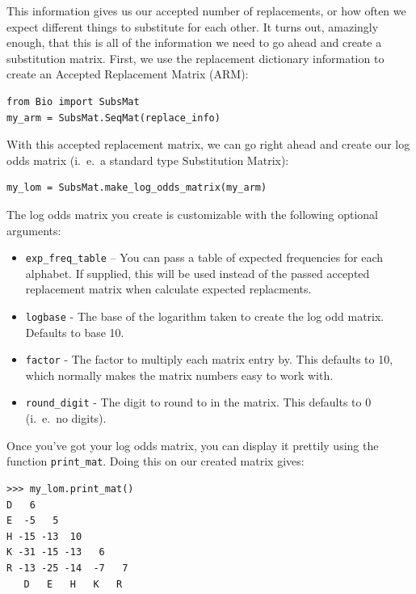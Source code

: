\documentclass{report}
\begin{document}
This information gives us our accepted number of replacements, or how
often we expect different things to substitute for each other. It
turns out, amazingly enough, that this is all of the information we
need to go ahead and create a substitution matrix. First, we use the
replacement dictionary information to create an Accepted Replacement
Matrix (ARM):

\begin{verbatim}
from Bio import SubsMat
my_arm = SubsMat.SeqMat(replace_info)
\end{verbatim}

With this accepted replacement matrix, we can go right ahead and
create our log odds matrix (i.~e.~a standard type Substitution Matrix):

\begin{verbatim}
my_lom = SubsMat.make_log_odds_matrix(my_arm)
\end{verbatim}

The log odds matrix you create is customizable with the following
optional arguments:

\begin{itemize}
  \item \verb|exp_freq_table| -- You can pass a table of expected
  frequencies for each alphabet. If supplied, this will be used
  instead of the passed accepted replacement matrix when calculate
  expected replacments.

  \item \verb|logbase| - The base of the logarithm taken to create the
  log odd matrix. Defaults to base 10.

  \item \verb|factor| - The factor to multiply each matrix entry
  by. This defaults to 10, which normally makes the matrix numbers
  easy to work with.

  \item \verb|round_digit| - The digit to round to in the matrix. This
  defaults to 0 (i.~e.~no digits).

\end{itemize}

Once you've got your log odds matrix, you can display it prettily
using the function \verb|print_mat|. Doing this on our created matrix
gives:

\begin{verbatim}
>>> my_lom.print_mat()
D   6
E  -5   5
H -15 -13  10
K -31 -15 -13   6
R -13 -25 -14  -7   7
   D   E   H   K   R
\end{verbatim}
\end{document}
